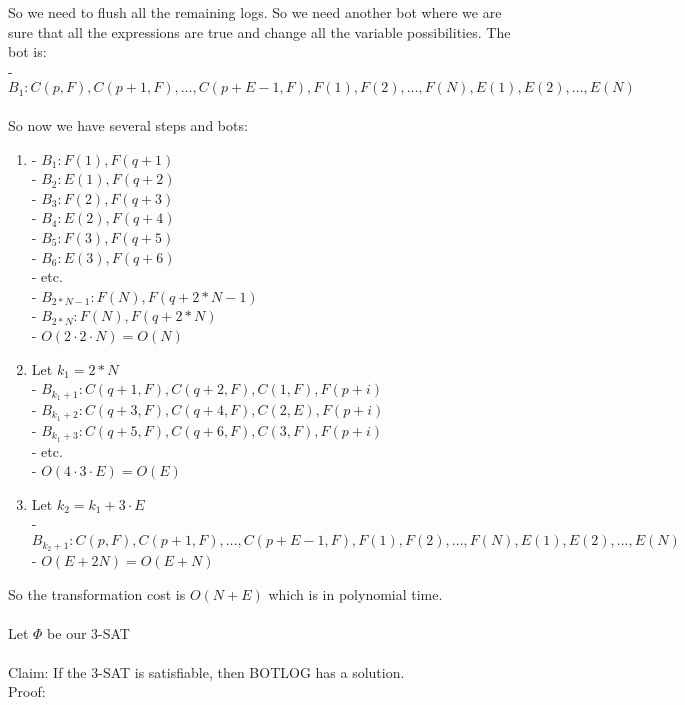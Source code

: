 \documentclass{article}
\begin{document}
\begin{enumerate}
{			So we need to flush all the remaining logs. So we need another bot where we are sure that all the expressions are true and change all the variable possibilities. The bot is:\\
			- $B_1: C(p, F), C(p + 1, F), \dots, C(p + E - 1, F), F(1), F(2), \dots, F(N), E(1), E(2), \dots, E(N)$\\
			\\
			So now we have several steps and bots:
			\begin{enumerate}
				\item {
					- $B_1: F(1), F(q + 1)$\\
					- $B_2: E(1), F(q + 2)$\\
					- $B_3: F(2), F(q + 3)$\\
					- $B_4: E(2), F(q + 4)$\\
					- $B_5: F(3), F(q + 5)$\\
					- $B_6: E(3), F(q + 6)$\\ 
					- etc.\\
					- $B_{2*N - 1}: F(N), F(q + 2*N - 1)$\\
					- $B_{2*N}: F(N), F(q + 2*N)$\\
					- $O(2 \cdot 2 \cdot N) = O(N)$
				}
				\item{
					Let $k_1 = 2 * N$\\
					- $B_{k_1+1}: C(q + 1, F), C(q + 2, F), C(1,F), F(p+i)$\\
					- $B_{k_1+2}: C(q + 3, F), C(q + 4, F), C(2,E), F(p+i)$\\
					- $B_{k_1+3}: C(q + 5, F), C(q + 6, F), C(3,F), F(p+i)$\\
					- etc.\\
					- $O(4 \cdot 3 \cdot E) = O(E)$
				}
				\item{
					Let $k_2 = k_1 + 3 \cdot E$\\
					- $B_{k_2+1}: C(p, F), C(p + 1, F), \dots, C(p + E - 1, F), F(1), F(2), \dots, F(N), E(1), E(2), \dots, E(N)$\\
					- $O(E + 2N) = O(E + N)$\\
				}
			\end{enumerate}
			So the transformation cost is $O(N + E)$ which is in polynomial time. \\\\
			Let $\Phi$ be our 3-SAT\\\\
			Claim: If the 3-SAT is satisfiable, then BOTLOG has a solution.\\
			Proof:\\
}
\end{enumerate}
\end{document}
